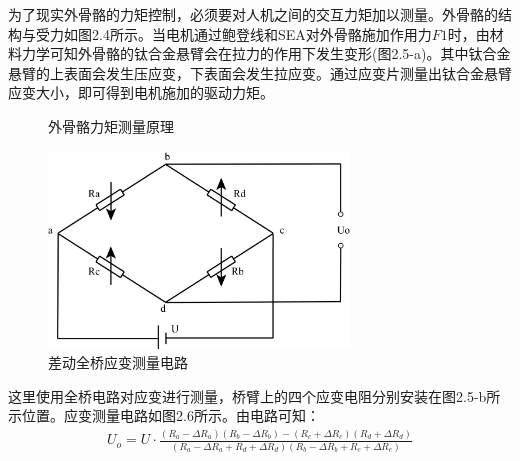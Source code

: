 为了现实外骨骼的力矩控制，必须要对人机之间的交互力矩加以测量。外骨骼的结构与受力如图2.4所示。当电机通过鲍登线和SEA对外骨骼施加作用力$F1$时，由材料力学可知外骨骼的钛合金悬臂会在拉力的作用下发生变形(图2.5-a)。其中钛合金悬臂的上表面会发生压应变，下表面会发生拉应变。通过应变片测量出钛合金悬臂应变大小，即可得到电机施加的驱动力矩。
\begin{figure}[htb]
    \quad
    \caption{外骨骼力矩测量原理}
    \label{fig:subfigss}
\end{figure}
\begin{figure}[htb]
    \includegraphics[width=8cm]{fig/f25.jpg}
    \caption{差动全桥应变测量电路}
    \label{fig:mark}
\end{figure}

这里使用全桥电路对应变进行测量，桥臂上的四个应变电阻分别安装在图2.5-b所示位置。应变测量电路如图2.6所示。由电路可知：
\begin{align}
U_o = U\cdot \frac{(R_a - \Delta R_a)(R_b - \Delta R_b) - (R_c + \Delta R_c)(R_d + \Delta R_d)}{(R_a - \Delta R_a + R_d + \Delta R_d)(R_b - \Delta R_b + R_c + \Delta R_c)}
\end{align}

